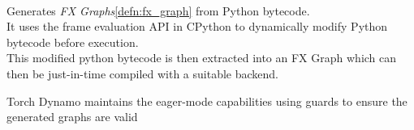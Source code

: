 \begin{defnbox}\nospacing
    \begin{defn}\label{defn:torch_dynamo}\leavevmode\\
        Generates \textit{FX Graphs}\cref{defn:fx_graph} from Python bytecode.\\
        It uses the frame evaluation API in CPython to dynamically modify Python bytecode before execution.\\
        This modified python bytecode is then extracted into an FX Graph which can then be just-in-time compiled with a suitable backend.
        \begin{figure}[H]
            \vspace{-1em}
            \centering{
              \def\svgwidth{200pt}
              \resizebox{\linewidth}{!}{}
            }
        \end{figure}
    \end{defn}
\end{defnbox}
\begin{notebox}[Note]\nospacing
    \begin{itemizenosep}
        \item Torch Dynamo maintains the eager-mode capabilities using guards to ensure the generated graphs are valid
    \end{itemizenosep}
\end{notebox}

